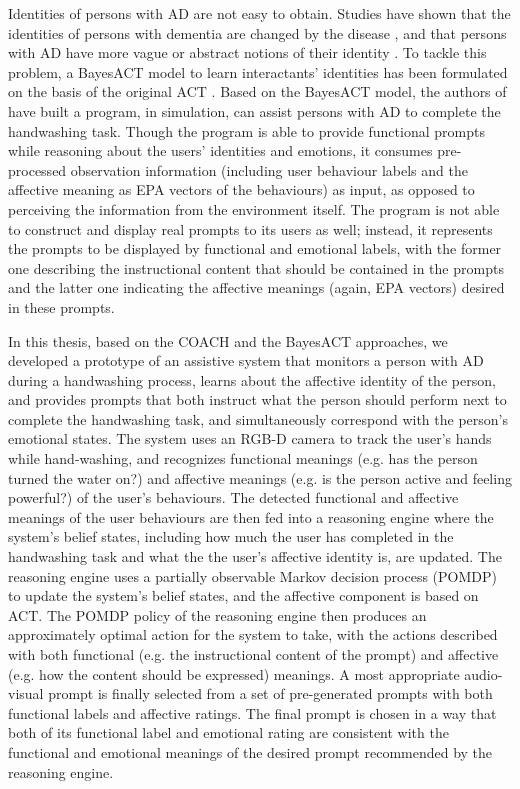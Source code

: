 Identities of persons with AD are not easy to obtain. Studies have shown that the identities of persons with dementia are changed by the disease \cite{orona1990temporality}, and that persons with AD have more vague or abstract notions of their identity \cite{rose2004memory}. To tackle this problem, a BayesACT model to learn interactants' identities has been formulated on the basis of the original ACT \cite{hoey2013bayesian}. Based on the BayesACT model, the authors of \cite{hoey2013bayesian} have built a program, in simulation, can assist persons with AD to complete the handwashing task. Though the program is able to provide functional prompts while reasoning about the users' identities and emotions, it consumes pre-processed observation information (including user behaviour labels and the affective meaning as EPA vectors of the behaviours) as input, as opposed to perceiving the information from the environment itself. The program is not able to construct and display real prompts to its users as well; instead, it represents the prompts to be displayed by functional and emotional labels, with the former one describing the instructional content that should be contained in the prompts and the latter one indicating the affective meanings  (again, EPA vectors) desired in these prompts.

In this thesis, based on the COACH and the BayesACT approaches, we developed a prototype of an assistive system that monitors a person with AD during a handwashing process, learns about the affective identity of the person, and provides prompts that both instruct what the person should perform next to complete the handwashing task, and simultaneously correspond with the person's emotional states. The system uses an RGB-D camera to track the user's hands while hand-washing, and recognizes functional meanings (e.g. has the person turned the water on?) and affective meanings (e.g. is the person active and feeling powerful?) of the user's behaviours. The detected functional and affective meanings of the user behaviours are then fed into a reasoning engine where the system's belief states, including how much the user has completed in the handwashing task and what the the user's affective identity is, are updated. The reasoning engine uses a partially observable Markov decision process (POMDP) to update the system's belief states, and the affective component is based on ACT. The POMDP policy of the reasoning engine then produces an approximately optimal action for the system to take, with the actions described with both functional (e.g. the instructional content of the prompt) and affective (e.g. how the content should be expressed) meanings. A most appropriate audio-visual prompt is finally selected from a set of pre-generated prompts with both functional labels and affective ratings. The final prompt is chosen in a way that both of its functional label and emotional rating are consistent with the functional and emotional meanings of the desired prompt recommended by the reasoning engine.

